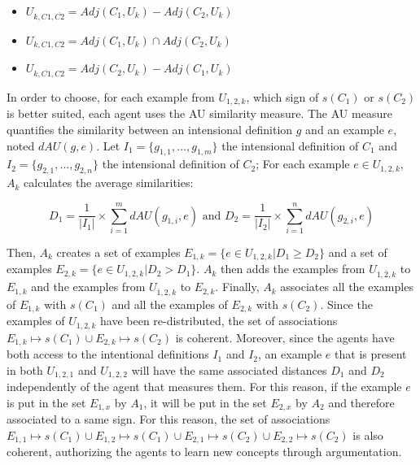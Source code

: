 \begin{itemize}
    \item $U_{k,C1,\overbar{C2}} = Adj(C_{1},U_{k}) - Adj(C_{2},U_{k})$
    \item $U_{k,C1,C2} = Adj(C_{1},U_{k}) \cap Adj(C_{2},U_{k})$
    \item $U_{k,\overbar{C1},C2} = Adj(C_{2},U_{k}) - Adj(C_{1},U_{k})$
\end{itemize}

In order to choose, for each example from $U_{1,2,k}$, which sign of $s(C_{1})$ or $s(C_{2})$ is better suited, each agent uses the AU similarity measure. The AU measure quantifies the similarity between an intensional definition $g$ and an example $e$, noted $dAU(g,e)$. Let $I_{1} = \{g_{1,1}, \ldots, g_{1,m}\}$ the intensional definition of $C_{1}$ and $I_{2} = \{g_{2,1}, \ldots, g_{2,n}\}$ the intensional definition of $C_{2}$; For each example $e \in U_{1,2,k}$, $A_{k}$ calculates the average similarities:

\[D_{1} = \frac{1}{|I_{1}|} \times \sum^{m}_{i=1} dAU(g_{1,i},e) \textrm{ and } D_{2} = \frac{1}{|I_{2}|} \times \sum^{n}_{i=1} dAU(g_{2,i},e) \]

Then, $A_{k}$ creates a set of examples $E_{1,k} = \{e \in U_{1,2,k} | D_{1} \geq D_{2} \}$ and a set of examples $E_{2,k} = \{e \in U_{1,2,k} | D_{2} > D_{1} \}$. $A_{k}$ then adds the examples from $U_{1,\overbar{2},k}$ to $E_{1,k}$ and the examples from $U_{\overbar{1},2,k}$ to $E_{2,k}$. Finally, $A_{k}$ associates all the examples of $E_{1,k}$ with $s(C_{1})$ and all the examples of $E_{2,k}$ with $s(C_{2})$. Since the examples of $U_{1,2,k}$ have been re-distributed, the set of associations $E_{1,k} \mapsto s(C_{1}) \cup E_{2,k} \mapsto s(C_{2})$ is coherent. Moreover, since the agents have both access to the intentional definitions $I_{1}$ and $I_{2}$, an example $e$ that is present in both $U_{1,2,1}$ and $U_{1,2,2}$ will have the same associated distances $D_{1}$ and $D_{2}$ independently of the agent that measures them. For this reason, if the example $e$ is put in the set $E_{1,x}$ by $A_{1}$, it will be put in the set $E_{2,x}$ by $A_{2}$ and therefore associated to a same sign. For this reason, the set of associations $E_{1,1} \mapsto s(C_{1}) \cup E_{1,2} \mapsto s(C_{1}) \cup E_{2,1} \mapsto s(C_{2}) \cup E_{2,2} \mapsto s(C_{2})$ is also coherent, authorizing the agents to learn new concepts through argumentation.

